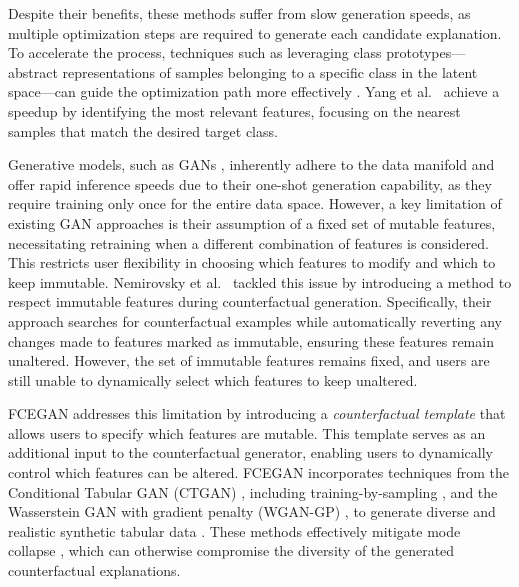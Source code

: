 \documentclass[runningheads]{llncs}
\begin{document}
 Despite their benefits, these methods suffer from slow generation speeds, as multiple optimization steps are required to generate each candidate explanation. To accelerate the process, techniques such as leveraging class prototypes—abstract representations of samples belonging to a specific class in the latent space—can guide the optimization path more effectively \cite{van2021interpretable}. Yang et al.~\cite{yang2022mace} achieve a speedup by identifying the most relevant features, focusing on the nearest samples that match the desired target class.

Generative models, such as GANs \cite{nemirovsky_2022_countergan,vanlooveren_2021_conditional,singla_2021_explaining}, inherently adhere to the data manifold and offer rapid inference speeds due to their one-shot generation capability, as they require training only once for the entire data space. However, a key limitation of existing GAN approaches is their assumption of a fixed set of mutable features, necessitating retraining when a different combination of features is considered. This restricts user flexibility in choosing which features to modify and which to keep immutable. Nemirovsky et al.~\cite{nemirovsky_2022_countergan} tackled this issue by introducing a method to respect immutable features during counterfactual generation. Specifically, their approach searches for counterfactual examples while automatically reverting any changes made to features marked as immutable, ensuring these features remain unaltered. However, the set of immutable features remains fixed, and users are still unable to dynamically select which features to keep unaltered. 

FCEGAN addresses this limitation by introducing a \textit{counterfactual template} that allows users to specify which features are mutable. This template serves as an additional input to the counterfactual generator, enabling users to dynamically control which features can be altered. FCEGAN incorporates techniques from the Conditional Tabular GAN (CTGAN) \cite{xu_modeling_2019}, including training-by-sampling \cite{engelmann_conditional_2021,zhao_ctab-gan_2021}, and the Wasserstein GAN \cite{arjovsky_towards_2017,arjovsky_wasserstein_2017} with gradient penalty (WGAN-GP) \cite{gulrajani_improvedwgan_2017}, to generate diverse and realistic synthetic tabular data \cite{xu_modeling_2019}. These methods effectively mitigate mode collapse \cite{srivastava2017veegan}, which can otherwise compromise the diversity of the generated counterfactual explanations.
\end{document}
